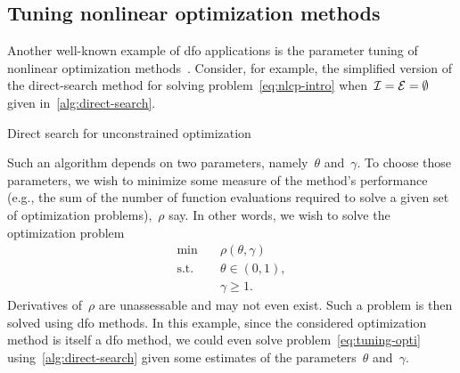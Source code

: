 \subsection{Tuning nonlinear optimization methods}

Another well-known example of \gls{dfo} applications is the parameter tuning of nonlinear optimization methods~\cite{Audet_Orban_2006}.
Consider, for example, the simplified version of the direct-search method for solving problem~\cref{eq:nlcp-intro} when~$\mathcal{I} = \mathcal{E} = \emptyset$ given in~\cref{alg:direct-search}.

\begin{algorithm}[htp]
    \caption{Direct search for unconstrained optimization}
    \label{alg:direct-search}
    \DontPrintSemicolon
\end{algorithm}

Such an algorithm depends on two parameters, namely~$\theta$ and~$\gamma$.
To choose those parameters, we wish to minimize some measure of the method's performance (e.g., the sum of the number of function evaluations required to solve a given set of optimization problems),~$\rho$ say.
In other words, we wish to solve the optimization problem
\begin{subequations}
    \label{eq:tuning-opti}
    \begin{align}
        \min        & \quad \rho(\theta, \gamma) \label{eq:tuning-opti-obj}\\
        \text{s.t.} & \quad \theta \in (0, 1), \label{eq:tuning-opti-theta}\\
                    & \quad \gamma \ge 1. \label{eq:tuning-opti-gamma}
    \end{align}
\end{subequations}
Derivatives of~$\rho$ are unassessable and may not even exist.
Such a problem is then solved using \gls{dfo} methods.
In this example, since the considered optimization method is itself a \gls{dfo} method, we could even solve problem~\cref{eq:tuning-opti} using~\cref{alg:direct-search} given some estimates of the parameters~$\theta$ and~$\gamma$.

